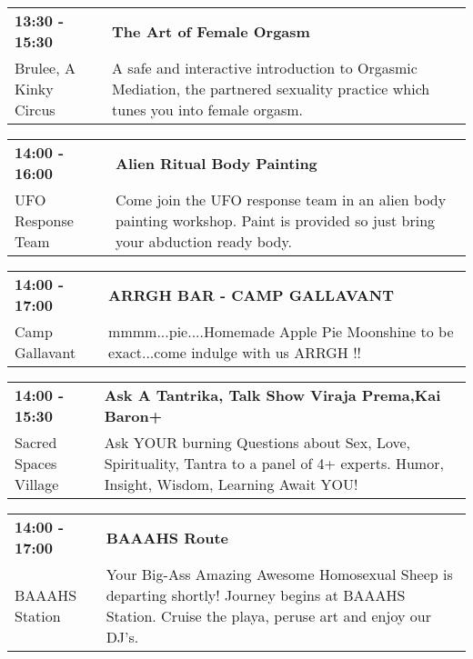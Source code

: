 \begin{tabular}{ p{1in} p{2.2in} }
    \textbf{13:30 - 15:30} & \textbf{The Art of Female Orgasm} \\
    Brulee, A Kinky Circus \newline  & A safe and interactive introduction to Orgasmic Mediation, the partnered sexuality practice which tunes you into female orgasm. \\
    \hline 
\end{tabular}
    
\begin{tabular}{ p{1in} p{2.2in} }
    \textbf{14:00 - 16:00} & \textbf{Alien Ritual Body Painting} \\
    UFO Response Team \newline  & Come join the UFO response team in an alien body painting workshop. Paint is provided so just bring your abduction ready body. \\
    \hline 
\end{tabular}
    
\begin{tabular}{ p{1in} p{2.2in} }
    \textbf{14:00 - 17:00} & \textbf{ARRGH BAR - CAMP GALLAVANT} \\
    Camp Gallavant \newline  & mmmm...pie....Homemade Apple Pie Moonshine to be exact...come indulge with us ARRGH !! \\
    \hline 
\end{tabular}
    
\begin{tabular}{ p{1in} p{2.2in} }
    \textbf{14:00 - 15:30} & \textbf{Ask A Tantrika, Talk Show Viraja Prema,Kai Baron+} \\
    Sacred Spaces Village \newline  & Ask YOUR burning Questions about Sex, Love, Spirituality, Tantra to a panel of 4+ experts.  Humor, Insight, Wisdom, Learning Await YOU! \\
    \hline 
\end{tabular}
    
\begin{tabular}{ p{1in} p{2.2in} }
    \textbf{14:00 - 17:00} & \textbf{BAAAHS Route} \\
    BAAAHS Station \newline  & Your Big-Ass Amazing Awesome Homosexual Sheep is departing shortly! Journey begins at BAAAHS Station. Cruise the playa, peruse art and enjoy our DJ's. \\
    \hline 
\end{tabular}
    
